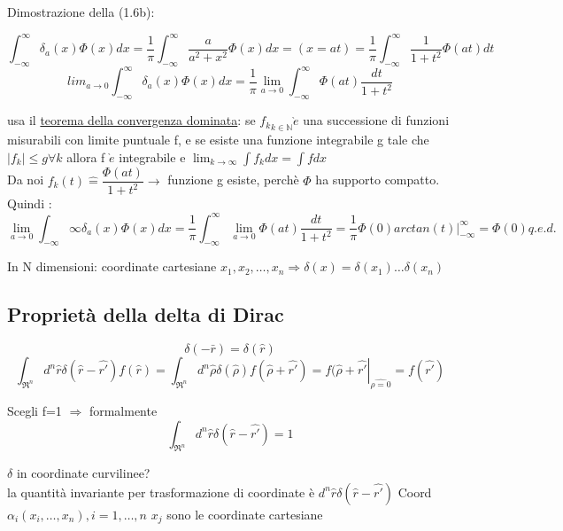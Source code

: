\documentclass[a4paper,11pt]{report}
\begin{document}
Dimostrazione della (1.6b):

$$\int_{-\infty}^{\infty} \delta_a(x)\Phi(x)dx=
\dfrac{1}{\pi}\int_{-\infty}^{\infty}\dfrac{a}{a^2+x^2}\Phi(x)dx = (x=at) = 
\dfrac{1}{\pi}\int_{-\infty}^{\infty}\dfrac{1}{1+t^2}\Phi(at)dt$$
$$lim_{a\to 0} \int_{-\infty}^{\infty}\delta_a(x)\Phi(x)dx=\dfrac{1}{\pi}\lim_{a\to 0}\int_{-\infty}^{\infty}\Phi(at)\dfrac{dt}{1+t^2}$$

usa il \underline{teorema della convergenza dominata}:
se ${f_k}_{k\in\mathbb{N}} \grave{e}$ una successione di funzioni misurabili con limite puntuale f, e se esiste una funzione integrabile g tale che $|f_k|\leq g \forall k$ allora f $\grave{e}$ integrabile e $\lim_{k\to \infty}\int f_k dx = \int f dx$\\
Da noi $f_k(t)\hat{=}\dfrac{\Phi(at)}{1+t^2}\rightarrow$ funzione g esiste, perchè $\Phi$ ha supporto compatto.\\
Quindi : $$
\lim_{a\to 0}\int_{-\infty}{\infty}\delta_a(x)\Phi(x)dx=\dfrac{1}{\pi}\int_{-\infty}^{\infty} \lim_{a\to 0} \Phi(at) \dfrac{dt}{1+t^2}=\dfrac{1}{\pi} \Phi(0) arctan(t)|_{-\infty}^{\infty}=\Phi(0) q.e.d.$$

In N dimensioni: coordinate cartesiane $x_1,x_2,\dots,x_n \Rightarrow \delta(x)= \delta(x_1)\dots \delta(x_n)$

\subsection{Proprietà della delta di Dirac}
$$\delta(-\bar{r})=\delta(\hat{r})$$
\begin{equation}
\int_{\Re^n} d^n\hat{r}\delta(\hat{r}-\hat{r'})f(\hat{r}) = \int_{\Re^n}d^n\hat{\rho}\delta(\hat{\rho})f(\hat{\rho}+\hat{r'})=\left.f(\hat{\rho}+\hat{r'}\right|_{\hat{\rho=0}}=f(\hat{r'})
\end{equation}

Scegli f=1 $\Rightarrow$ formalmente 
\begin{equation}
\int_{\Re^n}d^n\hat{r}\delta(\hat{r}-\hat{r'})=1
\end{equation}


$\delta$ in coordinate curvilinee?\\
la quantità invariante per trasformazione di coordinate è $d^n\hat{r}\delta(\hat{r}-\hat{r'})$
Coord $\alpha_i (x_i,\dots,x_n),i=1,\dots,n$
$x_j$ sono le coordinate cartesiane
\end{document}
